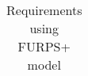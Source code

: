\begin{center}
\begin{longtable}{|c|p{3.5cm}|p{7cm}|c|}
        \caption[longtable]{Requirements using FURPS+ model} \\
    \end{longtable}

\end{center}







